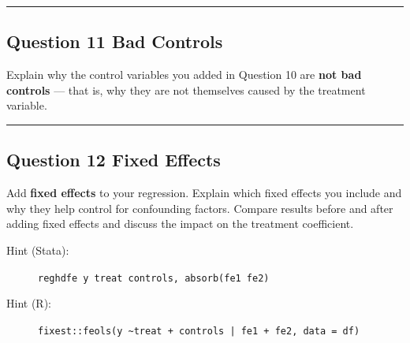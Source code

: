 \documentclass[paper=a4, fontsize=11pt]{scrartcl}
\newcommand{\horrule}[1]{\rule{\linewidth}{#1}}
\begin{document}
\bigskip\horrule{0.4pt}\bigskip


\subsection*{Question 11 \quad Bad Controls}

Explain why the control variables you added in Question 10 are \textbf{not bad controls} --- that is, why they are not themselves caused by the treatment variable.

\bigskip\horrule{0.4pt}\bigskip


\subsection*{Question 12 \quad Fixed Effects}

Add \textbf{fixed effects} to your regression. Explain which fixed effects you include and why they help control for confounding factors. Compare results before and after adding fixed effects and discuss the impact on the treatment coefficient.

\begin{description}
  \item[Hint (Stata):] \texttt{reghdfe y treat controls, absorb(fe1 fe2)}
  \item[Hint (R):] \texttt{fixest::feols(y \textasciitilde treat + controls | fe1 + fe2, data = df)}
\end{description}
\end{document}
